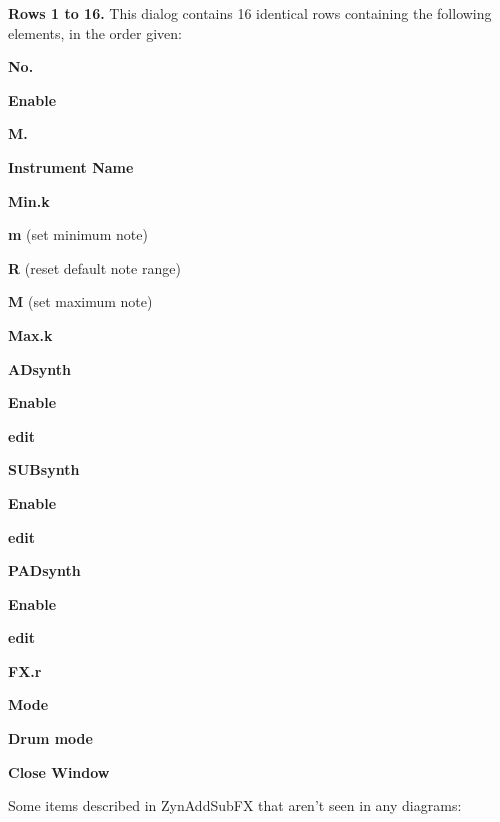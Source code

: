    \begin{enumber}
      \item \textbf{Rows 1 to 16.}
         This dialog contains 16 identical rows containing the following
         elements, in the order given:
         \begin{enumber}
            \item \textbf{No.}
            \item \textbf{Enable}
            \item \textbf{M.}
            \item \textbf{Instrument Name}
            \item \textbf{Min.k}
            \item \textbf{m} (set minimum note)
            \item \textbf{R} (reset default note range)
            \item \textbf{M} (set maximum note)
            \item \textbf{Max.k}
            \item \textbf{ADsynth}
               \begin{enumber}
                  \item \textbf{Enable}
                  \item \textbf{edit}
               \end{enumber}
            \item \textbf{SUBsynth}
               \begin{enumber}
                  \item \textbf{Enable}
                  \item \textbf{edit}
               \end{enumber}
            \item \textbf{PADsynth}
               \begin{enumber}
                  \item \textbf{Enable}
                  \item \textbf{edit}
               \end{enumber}
            \item \textbf{FX.r}
         \end{enumber}
      \item \textbf{Mode}
      \item \textbf{Drum mode}
      \item \textbf{Close Window}
   \end{enumber}

   Some items described in ZynAddSubFX that aren't seen in any diagrams:

